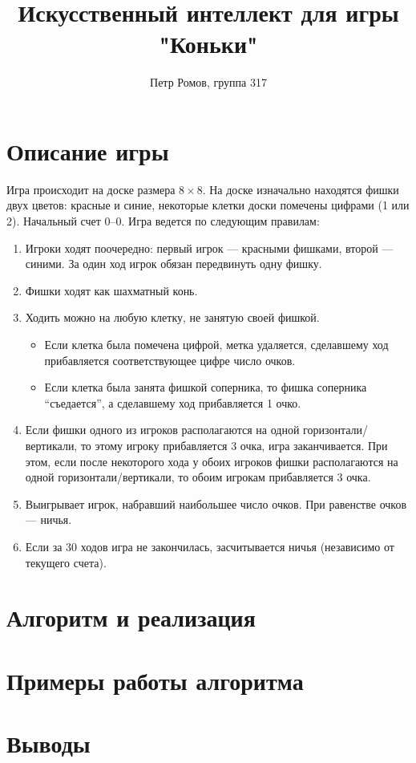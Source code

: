 \documentclass[a4paper]{article}
\title{Искусственный интеллект для игры "Коньки"}
\author{Петр Ромов, группа 317}
\date{}
\begin{document}
\maketitle

\section{Описание игры}

Игра происходит на доске размера $8 \times 8$. На доске изначально находятся фишки двух цветов: красные и синие, некоторые клетки доски помечены цифрами (1 или 2). Начальный счет 0--0. Игра ведется по следующим правилам:
\begin{enumerate}
\item Игроки ходят поочередно: первый игрок --- красными фишками, второй --- синими. За один ход игрок обязан передвинуть одну фишку.
\item Фишки ходят как шахматный конь.
\item Ходить можно на любую клетку, не занятую своей фишкой.
	\begin{itemize}
	\item Если клетка была помечена цифрой, метка удаляется, сделавшему ход прибавляется соответствующее цифре число очков.
	\item Если клетка была занята фишкой соперника, то фишка соперника ``съедается'', а сделавшему ход прибавляется 1 очко.
	\end{itemize}
\item Если фишки одного из игроков располагаются на одной горизонтали/вертикали, то этому игроку прибавляется 3 очка, игра заканчивается. При этом, если после некоторого хода у обоих игроков фишки располагаются на одной горизонтали/вертикали, то обоим игрокам прибавляется 3 очка.
\item Выигрывает игрок, набравший наибольшее число очков. При равенстве очков --- ничья.
\item Если за 30 ходов игра не закончилась, засчитывается ничья (независимо от текущего счета).
\end{enumerate}

\section{Алгоритм и реализация}

\section{Примеры работы алгоритма}

\section{Выводы}
\end{document}
